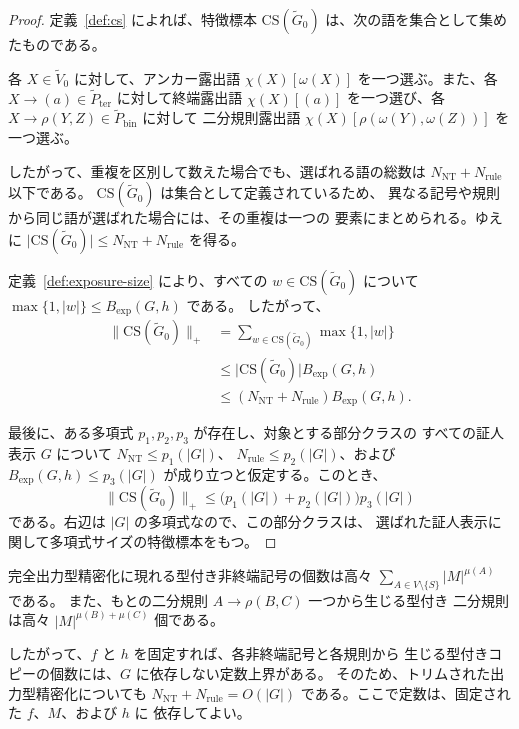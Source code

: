 \documentclass[11pt,a4paper]{ltjsarticle}
\theoremstyle{remark}
\newcommand{\CS}{\mathrm{CS}}
\begin{document}
\begin{proof}
定義~\ref{def:cs} によれば、特徴標本
\(\CS(\widetilde{G}_0)\) は、次の語を集合として集めたものである。

各 \(X\in\widetilde{V}_0\) に対して、アンカー露出語
\(\chi(X)[\omega(X)]\) を一つ選ぶ。また、各
\(X\to(a)\in\widetilde{P}_{\mathrm{ter}}\) に対して終端露出語
\(\chi(X)[(a)]\) を一つ選び、各
\(X\to\rho(Y,Z)\in\widetilde{P}_{\mathrm{bin}}\) に対して
二分規則露出語
\(\chi(X)[\rho(\omega(Y),\omega(Z))]\) を一つ選ぶ。

したがって、重複を区別して数えた場合でも、選ばれる語の総数は
\(N_{\mathrm{NT}}+N_{\mathrm{rule}}\) 以下である。
\(\CS(\widetilde{G}_0)\) は集合として定義されているため、
異なる記号や規則から同じ語が選ばれた場合には、その重複は一つの
要素にまとめられる。ゆえに
\(\lvert\CS(\widetilde{G}_0)\rvert
\le N_{\mathrm{NT}}+N_{\mathrm{rule}}\)
を得る。

定義~\ref{def:exposure-size} により、すべての
\(w\in\CS(\widetilde{G}_0)\) について
\(\max\{1,\lvert w\rvert\}\le B_{\mathrm{exp}}(G,h)\) である。
したがって、
\[
\begin{aligned}
  \lVert\CS(\widetilde{G}_0)\rVert_+
  &=
  \sum_{w\in\CS(\widetilde{G}_0)}
  \max\{1,\lvert w\rvert\}\\
  &\le
  \lvert\CS(\widetilde{G}_0)\rvert
  B_{\mathrm{exp}}(G,h)\\
  &\le
  (N_{\mathrm{NT}}+N_{\mathrm{rule}})
  B_{\mathrm{exp}}(G,h).
\end{aligned}
\]

最後に、ある多項式 \(p_1,p_2,p_3\) が存在し、対象とする部分クラスの
すべての証人表示 \(G\) について
\(N_{\mathrm{NT}}\le p_1(\lvert G\rvert)\)、
\(N_{\mathrm{rule}}\le p_2(\lvert G\rvert)\)、および
\(B_{\mathrm{exp}}(G,h)\le p_3(\lvert G\rvert)\)
が成り立つと仮定する。このとき、
\[
  \lVert\CS(\widetilde{G}_0)\rVert_+
  \le
  \bigl(
    p_1(\lvert G\rvert)+p_2(\lvert G\rvert)
  \bigr)
  p_3(\lvert G\rvert)
\]
である。右辺は \(\lvert G\rvert\) の多項式なので、この部分クラスは、
選ばれた証人表示に関して多項式サイズの特徴標本をもつ。
\end{proof}

完全出力型精密化に現れる型付き非終端記号の個数は高々
\(\sum_{A\in V\setminus\{S\}}\lvert M\rvert^{\mu(A)}\) である。
また、もとの二分規則 \(A\to\rho(B,C)\) 一つから生じる型付き
二分規則は高々
\(\lvert M\rvert^{\mu(B)+\mu(C)}\) 個である。

したがって、\(f\) と \(h\) を固定すれば、各非終端記号と各規則から
生じる型付きコピーの個数には、\(G\) に依存しない定数上界がある。
そのため、トリムされた出力型精密化についても
\(N_{\mathrm{NT}}+N_{\mathrm{rule}}=O(\lvert G\rvert)\)
である。ここで定数は、固定された \(f\)、\(M\)、および \(h\) に
依存してよい。
\end{document}
